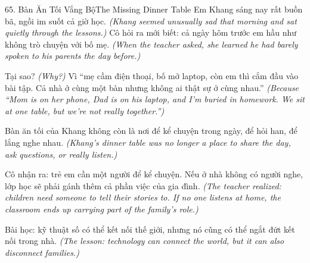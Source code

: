 \begin{truyen}{65. Bàn Ăn Tối Vắng Bộ}{The Missing Dinner Table}
Em Khang sáng nay rất buồn bã, ngồi im suốt cả giờ học.
\textit{(Khang seemed unusually sad that morning and sat quietly through the lessons.)}
Cô hỏi ra mới biết: cả ngày hôm trước em hầu như không trò chuyện với bố mẹ.
\textit{(When the teacher asked, she learned he had barely spoken to his parents the day before.)}

Tại sao?
\textit{(Why?)}
Vì ``mẹ cầm điện thoại, bố mở laptop, còn em thì cắm đầu vào bài tập. Cả nhà ở cùng một bàn nhưng không ai thật sự ở cùng nhau.''
\textit{(Because ``Mom is on her phone, Dad is on his laptop, and I'm buried in homework. We sit at one table, but we're not really together.'')}

Bàn ăn tối của Khang không còn là nơi để kể chuyện trong ngày, để hỏi han, để lắng nghe nhau.
\textit{(Khang's dinner table was no longer a place to share the day, ask questions, or really listen.)}

Cô nhận ra: trẻ em cần một người để kể chuyện. Nếu ở nhà không có người nghe, lớp học sẽ phải gánh thêm cả phần việc của gia đình.
\textit{(The teacher realized: children need someone to tell their stories to. If no one listens at home, the classroom ends up carrying part of the family's role.)}

Bài học: kỹ thuật số có thể kết nối thế giới, nhưng nó cũng có thể ngắt đứt kết nối trong nhà.
\textit{(The lesson: technology can connect the world, but it can also disconnect families.)}
\end{truyen}

